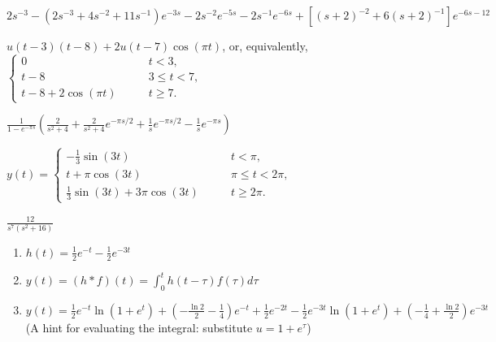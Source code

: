 


\item
$2s^{-3}-(2s^{-3}+4s^{-2}+11s^{-1})e^{-3s} -2s^{-2}e^{-5s} -2s^{-1}e^{-6s}
+[(s+2)^{-2}+6(s+2)^{-1}]e^{-6s-12}$

\item
$u(t-3)(t-8) +2u(t-7)\cos(\pi t)$,
or, equivalently,
$\left\{ \begin{array}{ll}
0\qquad & t<3,\\
t-8\qquad & 3\le t<7,\\
t-8+2\cos(\pi t)\qquad & t\ge 7.
\end{array} \right.$

\def\LaplacePeriodicAns{
\item
$\frac{1}{1-e^{-\pi s}}\left(
\frac{2}{s^2+4} +\frac{2}{s^2+4}e^{-\pi s/2} 
+\frac{1}{s}e^{-\pi s/2}-\frac{1}{s}e^{-\pi s}
\right)$
}

\LaplacePeriodicAns


\item
$y(t)=\left\{ \begin{array}{ll}
-\frac{1}{3}\sin(3t) \qquad & t<\pi,\\
t+\pi\cos(3t)\qquad & \pi\le t<2\pi,\\
\frac{1}{3}\sin(3t) +3\pi\cos(3t)\qquad & t\ge 2\pi.
\end{array} \right.$

\def\LaplaceConvolutionAns{
\item
$\displaystyle \frac{12}{s^7 (s^2+16)}$
}

\LaplaceConvolutionAns


\def\LaplaceImpulseAns{
\item
	\begin{enumerate}
	\item
$h(t)=\frac{1}{2}e^{-t} -\frac{1}{2}e^{-3t}$
	\item
$y(t)=(h*f)(t)=\int_0^t h(t-\tau)f(\tau) d\tau$
	\item
$y(t)=\frac{1}{2}e^{-t}\ln(1+e^t)
+\left( -\frac{\ln 2}{2} -\frac{1}{4} \right)e^{-t}
+\frac{1}{2}e^{-2t}
-\frac{1}{2}e^{-3t}\ln(1+e^t)
+\left( -\frac{1}{4}+\frac{\ln2}{2} \right)e^{-3t}$
(A hint for evaluating the integral: substitute $u=1+e^\tau$)
	\end{enumerate}
}

\LaplaceImpulseAns


% 
% 



